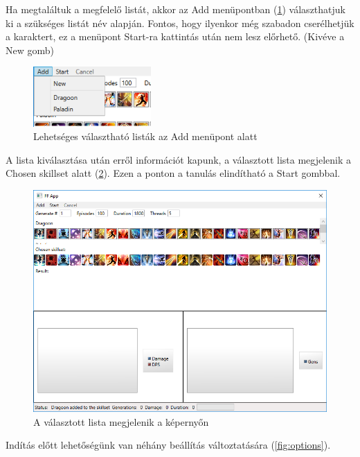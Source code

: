 \documentclass[12pt]{article}
\begin{document}
Ha megtaláltuk a megfelelő listát, akkor az Add menüpontban (\ref{fig:addmenu}) választhatjuk ki a szükséges listát név alapján. Fontos, hogy ilyenkor még szabadon cserélhetjük a karaktert, ez a menüpont Start-ra kattintás után nem lesz előrhető. (Kivéve a New gomb)

\begin{figure}[H]
	\begin{center}
		\includegraphics[width=0.4\textwidth]{addmenu}
	\end{center}
	\caption{Lehetséges választható listák az Add menüpont alatt}
	\label{fig:addmenu}
\end{figure}

A lista kiválasztása után erről információt kapunk, a választott lista megjelenik a Chosen skillset alatt (\ref{fig:chosen}). Ezen a ponton a tanulás elindítható a Start gombbal.

\begin{figure}[H]
	\begin{center}
		\includegraphics[width=1\textwidth]{chosen}
	\end{center}
	\caption{A választott lista megjelenik a képernyőn}
	\label{fig:chosen}
\end{figure}

Indítás előtt lehetőségünk van néhány beállítás változtatására (\ref{fig:options}).
\end{document}

